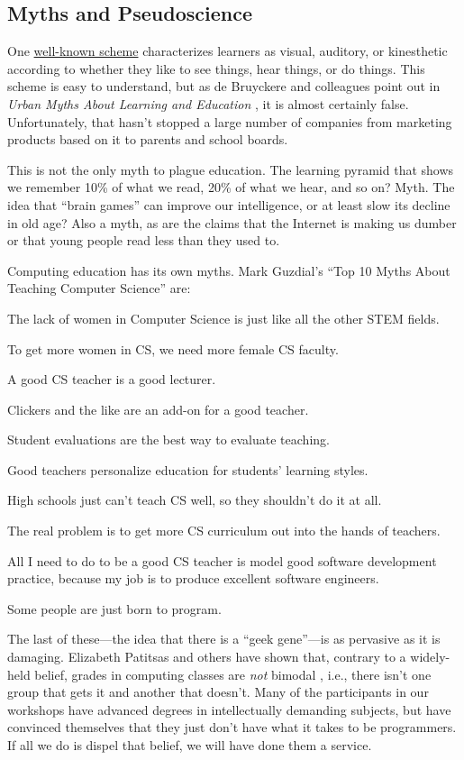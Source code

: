 \subsection{Myths and Pseudoscience}\label{myths-and-pseudoscience}

One
\href{https://en.wikipedia.org/wiki/Learning\_styles\#Learning\_modalities}{well-known
scheme} characterizes learners as visual, auditory, or kinesthetic
according to whether they like to see things, hear things, or do things.
This scheme is easy to understand, but as de Bruyckere and colleagues
point out in
\textit{Urban Myths About Learning and Education} \cite{bib:debruyckere-urban-myths},
it is almost certainly false.
Unfortunately, that hasn't stopped a large number of companies from
marketing products based on it to parents and school boards.

This is not the only myth to plague education. The learning pyramid that
shows we remember 10\% of what we read, 20\% of what we hear, and so on?
Myth.
The idea that ``brain games'' can improve our intelligence, or at least
slow its decline in old age?
Also a myth, as are the claims that the Internet is making us dumber or that
young people read less than they used to.

Computing education has its own myths. Mark Guzdial's
``Top 10 Myths About Teaching Computer Science'' \cite{bib:guzdial-top10} are:

The lack of women in Computer Science is just like all the other STEM
fields.

To get more women in CS, we need more female CS faculty.

A good CS teacher is a good lecturer.

Clickers and the like are an add-on for a good teacher.

Student evaluations are the best way to evaluate teaching.

Good teachers personalize education for students' learning styles.

High schools just can't teach CS well, so they shouldn't do it at all.

The real problem is to get more CS curriculum out into the hands of
teachers.

All I need to do to be a good CS teacher is model good software
development practice, because my job is to produce excellent software
engineers.

Some people are just born to program.

The last of these---the idea that there is a ``geek gene''---is as
pervasive as it is damaging. Elizabeth Patitsas and others have shown
that, contrary to a widely-held belief,
grades in computing classes are \emph{not} bimodal \cite{bib:patitsas-cs-grades},
i.e., there isn't one group that gets
it and another that doesn't. Many of the participants in our workshops
have advanced degrees in intellectually demanding subjects, but have
convinced themselves that they just don't have what it takes to be
programmers. If all we do is dispel that belief, we will have done them
a service.

